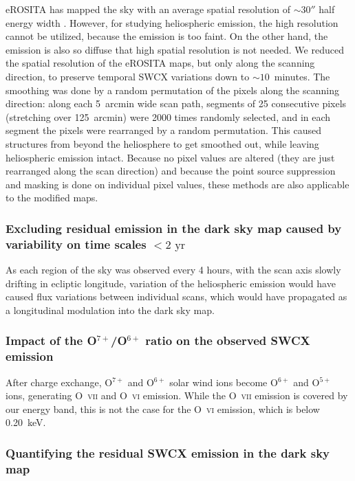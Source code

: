 \documentclass[12pt]{article}
\begin{document}
eROSITA has mapped the sky with an average spatial resolution of $\sim30''$ half energy width \cite{mer24a}. However, for studying heliospheric emission, the high resolution cannot be utilized, because the emission is too faint. On the other hand, the emission is also so diffuse that high spatial resolution is not needed. We reduced the spatial resolution of the eROSITA maps, but only along the scanning direction, to preserve temporal SWCX variations down to $\sim10$~minutes. The smoothing was done by a random permutation of the pixels along the scanning direction: along each 5~arcmin wide scan path, segments of 25 consecutive pixels (stretching over 125~arcmin) were 2000 times randomly selected, and in each segment the pixels were rearranged by a random permutation. This caused structures from beyond the heliosphere to get smoothed out, while leaving heliospheric emission intact. Because no pixel values are altered (they are just rearranged along the scan direction) and because the point source suppression and masking is done on individual pixel values, these methods are also applicable to the modified maps.

\subsubsection*{Excluding residual emission in the dark sky map caused by variability on time scales $<2\mbox{ yr}$ }

As each region of the sky was observed every 4 hours, with the scan axis slowly drifting in ecliptic longitude, variation of the heliospheric emission would have caused flux variations between individual scans, which would have propagated as a longitudinal modulation into the dark sky map.

\subsubsection*{Impact of the O$^{7+}$/O$^{6+}$ ratio on the observed SWCX emission}

After charge exchange, O$^{7+}$ and O$^{6+}$ solar wind ions become O$^{6+}$ and O$^{5+}$ ions, generating O~\textsc{vii} and O~\textsc{vi} emission. While the O~\textsc{vii} emission is covered by our energy band, this is not the case for the O~\textsc{vi} emission, which is below 0.20~keV.

\subsubsection*{Quantifying the residual SWCX emission in the dark sky map}
\end{document}
